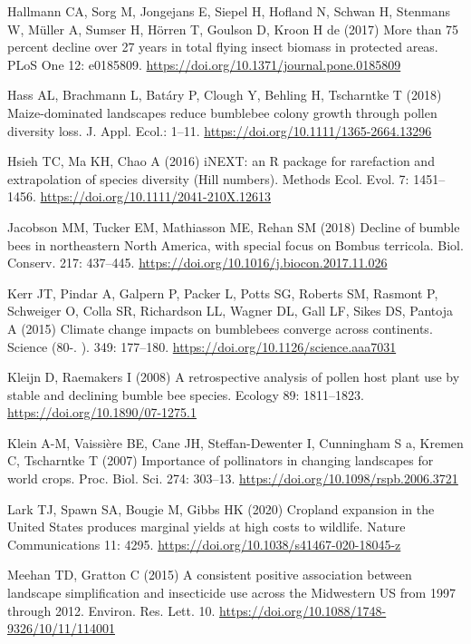 \documentclass[11pt,]{article}
\begin{document}
\leavevmode\hypertarget{ref-Hallmann2017}{}%
Hallmann CA, Sorg M, Jongejans E, Siepel H, Hofland N, Schwan H,
Stenmans W, Müller A, Sumser H, Hörren T, Goulson D, Kroon H de (2017)
More than 75 percent decline over 27 years in total flying insect
biomass in protected areas. PLoS One 12: e0185809.
\url{https://doi.org/10.1371/journal.pone.0185809}

\leavevmode\hypertarget{ref-Hass2018a}{}%
Hass AL, Brachmann L, Batáry P, Clough Y, Behling H, Tscharntke T (2018)
Maize-dominated landscapes reduce bumblebee colony growth through pollen
diversity loss. J. Appl. Ecol.: 1--11.
\url{https://doi.org/10.1111/1365-2664.13296}

\leavevmode\hypertarget{ref-Hsieh2016}{}%
Hsieh TC, Ma KH, Chao A (2016) iNEXT: an R package for rarefaction and
extrapolation of species diversity (Hill numbers). Methods Ecol. Evol.
7: 1451--1456. \url{https://doi.org/10.1111/2041-210X.12613}

\leavevmode\hypertarget{ref-Jacobson2018a}{}%
Jacobson MM, Tucker EM, Mathiasson ME, Rehan SM (2018) Decline of bumble
bees in northeastern North America, with special focus on Bombus
terricola. Biol. Conserv. 217: 437--445.
\url{https://doi.org/10.1016/j.biocon.2017.11.026}

\leavevmode\hypertarget{ref-Kerr2015}{}%
Kerr JT, Pindar A, Galpern P, Packer L, Potts SG, Roberts SM, Rasmont P,
Schweiger O, Colla SR, Richardson LL, Wagner DL, Gall LF, Sikes DS,
Pantoja A (2015) Climate change impacts on bumblebees converge across
continents. Science (80-. ). 349: 177--180.
\url{https://doi.org/10.1126/science.aaa7031}

\leavevmode\hypertarget{ref-Kleijn2008}{}%
Kleijn D, Raemakers I (2008) A retrospective analysis of pollen host
plant use by stable and declining bumble bee species. Ecology 89:
1811--1823. \url{https://doi.org/10.1890/07-1275.1}

\leavevmode\hypertarget{ref-Klein2007g}{}%
Klein A-M, Vaissière BE, Cane JH, Steffan-Dewenter I, Cunningham S a,
Kremen C, Tscharntke T (2007) Importance of pollinators in changing
landscapes for world crops. Proc. Biol. Sci. 274: 303--13.
\url{https://doi.org/10.1098/rspb.2006.3721}

\leavevmode\hypertarget{ref-Lark.2020}{}%
Lark TJ, Spawn SA, Bougie M, Gibbs HK (2020) Cropland expansion in the
United States produces marginal yields at high costs to wildlife. Nature
Communications 11: 4295.
\url{https://doi.org/10.1038/s41467-020-18045-z}

\leavevmode\hypertarget{ref-Meehan2015}{}%
Meehan TD, Gratton C (2015) A consistent positive association between
landscape simplification and insecticide use across the Midwestern US
from 1997 through 2012. Environ. Res. Lett. 10.
\url{https://doi.org/10.1088/1748-9326/10/11/114001}
\end{document}
